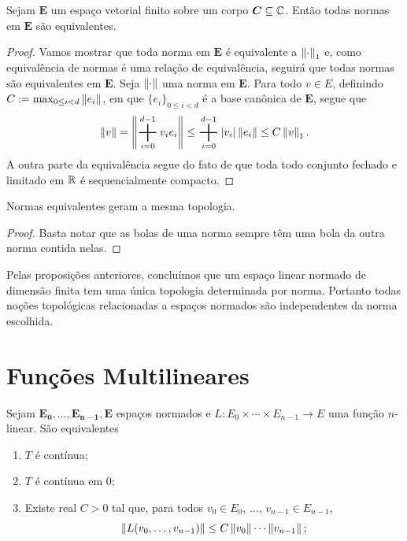 \begin{prop}
Sejam $\bm E$ um espaço vetorial finito sobre um corpo $\bm C \subseteq \mathbb{C}$. Então todas normas em $\bm E$ são equivalentes.
\end{prop}
\begin{proof}
Vamos mostrar que toda norma em $\bm E$ é equivalente a $\left\Vert{\cdot}\right\Vert_1$ e, como equivalência de normas é uma relação de equivalência, seguirá que todas normas são equivalentes em $\bm E$. Seja $\left\Vert{\cdot}\right\Vert$ uma norma em $\bm E$. Para todo $v \in E$, definindo $C := \max_{0\leq i <d} \left\Vert{e_i}\right\Vert$, em que $\{e_i\}_{0 \leq i < d}$ é a base canônica de $\bm E$, segue que
	\begin{equation*}
	\nor{v} = \nor{\sum_{i=0}^{d-1} v_ie_i} \leq \sum_{i=0}^{d-1}\abs{v_i}\nor{e_i} \leq C\nor{v}_1.
	\end{equation*}
A outra parte da equivalência segue do fato de que toda todo conjunto fechado e limitado em $\mathbb{R}$ é sequencialmente compacto.
\end{proof}

\begin{prop}
Normas equivalentes geram a mesma topologia.
\end{prop}
\begin{proof}
Basta notar que as bolas de uma norma sempre têm uma bola da outra norma contida nelas.
\end{proof}

Pelas proposições anteriores, concluímos que um espaço linear normado de dimensão finita tem uma única topologia determinada por norma.
Portanto todas noções topológicas relacionadas a espaços normados são independentes da norma escolhida.

\section{Funções Multilineares}

\begin{prop}
Sejam $\bm{E_0},\dots,\bm{E_{n-1}},\bm{E}$ espaços normados e $L\colon E_0 \times \cdots \times E_{n-1} \to E$ uma função $n$-linear. São equivalentes
	\begin{enumerate}
	\item $T$ é contínua;
	\item $T$ é contínua em $0$;
	\item Existe real $C>0$ tal que, para todos $v_0 \in E_0$, $\ldots$, $v_{n-1} \in E_{n-1}$,
		\begin{equation*}
		\left\Vert{L(v_0,\dots,v_{n-1})}\right\Vert \leq C\left\Vert{v_0}\right\Vert\cdots\left\Vert{v_{n-1}}\right\Vert;
		\end{equation*}	
	\end{enumerate}
\end{prop}

